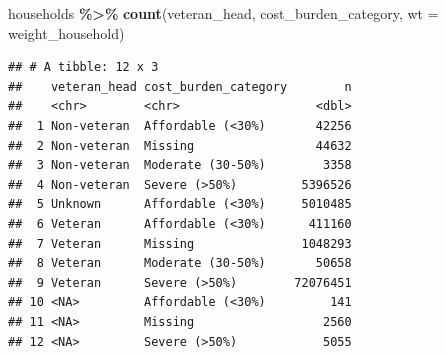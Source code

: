 \documentclass[
]{article}
\newenvironment{Shaded}{\begin{snugshade}}{\end{snugshade}}
\newcommand{\AttributeTok}[1]{\textcolor[rgb]{0.13,0.29,0.53}{#1}}
\newcommand{\FunctionTok}[1]{\textcolor[rgb]{0.13,0.29,0.53}{\textbf{#1}}}
\newcommand{\NormalTok}[1]{#1}
\newcommand{\SpecialCharTok}[1]{\textcolor[rgb]{0.81,0.36,0.00}{\textbf{#1}}}
\begin{document}
\begin{Shaded}
\begin{Highlighting}[]
\NormalTok{households }\SpecialCharTok{\%\textgreater{}\%} \FunctionTok{count}\NormalTok{(veteran\_head, cost\_burden\_category, }\AttributeTok{wt =}\NormalTok{ weight\_household)}
\end{Highlighting}
\end{Shaded}

\begin{verbatim}
## # A tibble: 12 x 3
##    veteran_head cost_burden_category        n
##    <chr>        <chr>                   <dbl>
##  1 Non-veteran  Affordable (<30%)       42256
##  2 Non-veteran  Missing                 44632
##  3 Non-veteran  Moderate (30-50%)        3358
##  4 Non-veteran  Severe (>50%)         5396526
##  5 Unknown      Affordable (<30%)     5010485
##  6 Veteran      Affordable (<30%)      411160
##  7 Veteran      Missing               1048293
##  8 Veteran      Moderate (30-50%)       50658
##  9 Veteran      Severe (>50%)        72076451
## 10 <NA>         Affordable (<30%)         141
## 11 <NA>         Missing                  2560
## 12 <NA>         Severe (>50%)            5055
\end{verbatim}
\end{document}
